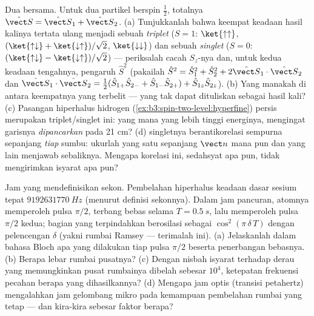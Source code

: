 \begin{exercise}[$\star\star\star$]\label{exo:b3:spin-two-level:11}
Dua  bersama. Untuk dua partikel berspin $\tfrac12$,  totalnya
$\hat{\vect S} = \hat{\vect S}_1 + \hat{\vect S}_2$. (a) Tunjukkanlah
bahwa keempat keadaan hasil kalinya tertata ulang menjadi sebuah
\emph{triplet} ($S = 1$:
$\ket{\uparrow\uparrow}$, $(\ket{\uparrow\downarrow} +
\ket{\downarrow\uparrow})/\sqrt2$, $\ket{\downarrow\downarrow}$)
dan sebuah \emph{singlet} ($S = 0$: $(\ket{\uparrow\downarrow} -
\ket{\downarrow\uparrow})/\sqrt2$) --- periksalah cacah $S_z$-nya dan,
untuk kedua keadaan tengahnya, pengaruh $\hat S^2$ (pakailah $\hat
S^2 = \hat S_1^2 + \hat S_2^2 + 2\hat{\vect S}_1\cdot\hat{\vect
S}_2$ dan $\hat{\vect S}_1\cdot\hat{\vect S}_2 = \tfrac12(\hat
S_{1+}\hat S_{2-} + \hat S_{1-}\hat S_{2+}) + \hat S_{1z}\hat
S_{2z}$). (b) Yang manakah di antara keempatnya yang terbelit --- yang
tak dapat dituliskan sebagai hasil kali? (c) Pasangan hiperhalus
hidrogen (\cref{ex:b3:spin-two-level:hyperfine}) persis merupakan
triplet/singlet ini: yang mana yang lebih tinggi energinya, mengingat
garisnya \emph{dipancarkan} pada 21 cm? (d)  singletnya
berantikorelasi sempurna sepanjang \emph{tiap} sumbu: ukurlah yang satu
sepanjang $\vect n$ mana pun dan yang lain menjawab sebaliknya. Mengapa
korelasi ini, sedahsyat apa pun, tidak mengirimkan isyarat apa pun?
\end{exercise}

\begin{exercise}[$\star\star\star$]\label{exo:b3:spin-two-level:12}
Jam yang mendefinisikan sekon. Pembelahan hiperhalus keadaan dasar
sesium tepat $\qty{9192631770}{Hz}$ (menurut definisi sekonnya). Dalam
jam pancuran, atomnya memperoleh pulsa $\pi/2$, terbang bebas selama
$T = \qty{0.5}{s}$, lalu memperoleh pulsa $\pi/2$ kedua; bagian yang
terpindahkan berosilasi sebagai $\cos^2(\pi\,\delta\,T)$ dengan
pelencengan $\delta$ (yakni rumbai Ramsey --- terimalah ini). (a)
Jelaskanlah dalam bahasa Bloch apa yang dilakukan tiap pulsa $\pi/2$
beserta penerbangan bebasnya. (b) Berapa lebar rumbai pusatnya? (c)
Dengan nisbah isyarat terhadap derau yang memungkinkan pusat rumbainya
dibelah sebesar $10^4$, ketepatan frekuensi pecahan berapa yang
dihasilkannya? (d) Mengapa jam optis (transisi petahertz) mengalahkan
jam gelombang mikro pada kemampuan pembelahan rumbai yang tetap --- dan
kira-kira sebesar faktor berapa?
\end{exercise}

